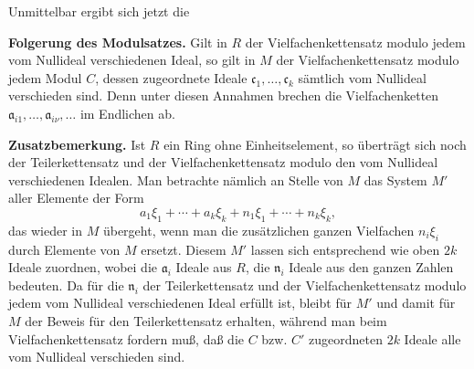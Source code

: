 \documentclass[11pt]{article}
\begin{document}
Unmittelbar ergibt sich jetzt die

\medskip
\noindent\textbf{Folgerung des Modulsatzes.} Gilt in $R$ der
Vielfachenkettensatz modulo jedem vom Nullideal verschiedenen Ideal, so gilt in
$M$ der Vielfachenkettensatz modulo jedem Modul $C$, dessen zugeordnete Ideale
$\mathfrak c_1,\ldots,\mathfrak c_k$ sämtlich vom Nullideal verschieden sind.
Denn unter diesen Annahmen brechen die Vielfachenketten
$\mathfrak a_{i1},\ldots,\mathfrak a_{i\nu},\ldots$ im Endlichen ab.

\medskip
\noindent\textbf{Zusatzbemerkung.} Ist $R$ ein Ring ohne Einheitselement, so
überträgt sich noch der Teilerkettensatz und der Vielfachenkettensatz modulo den
vom Nullideal verschiedenen Idealen. Man betrachte nämlich an Stelle von $M$ das
System $M'$ aller Elemente der Form
\[
        a_1\xi_1+\cdots+a_k\xi_k+n_1\xi_1+\cdots+n_k\xi_k,
\]
das wieder in $M$ übergeht, wenn man die zusätzlichen ganzen Vielfachen
$n_i\xi_i$ durch Elemente von $M$ ersetzt. Diesem $M'$ lassen sich entsprechend
wie oben $2k$ Ideale zuordnen, wobei die $\mathfrak a_i$ Ideale aus $R$, die
$\mathfrak n_i$ Ideale aus den ganzen Zahlen bedeuten. Da für die
$\mathfrak n_i$ der Teilerkettensatz und der Vielfachenkettensatz modulo jedem
vom Nullideal verschiedenen Ideal erfüllt ist, bleibt für $M'$ und damit für $M$
der Beweis für den Teilerkettensatz erhalten, während man beim
Vielfachenkettensatz fordern muß, daß die $C$ bzw. $C'$ zugeordneten $2k$ Ideale
alle vom Nullideal verschieden sind.
\end{document}
